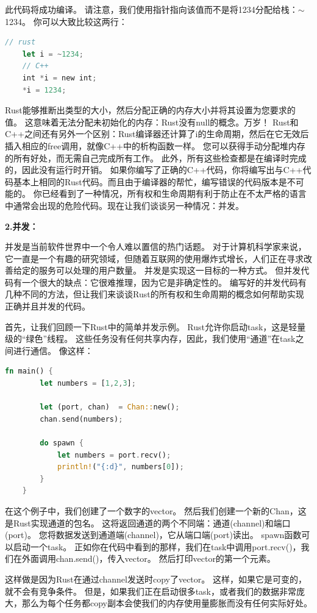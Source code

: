 此代码将成功编译。 请注意，我们使用指针指向该值而不是将1234分配给栈：$\sim$1234。 你可以大致比较这两行：
\begin{lstlisting}[language={Rust}, label={code:forktest},
	caption={forktest.rs}]
	// rust
	let i = ~1234;
	// C++
	int *i = new int;
	*i = 1234;
\end{lstlisting}

Rust能够推断出类型的大小，然后分配正确的内存大小并将其设置为您要求的值。 这意味着无法分配未初始化的内存：Rust没有null的概念。万岁！ Rust和C++之间还有另外一个区别：Rust编译器还计算了i的生命周期，然后在它无效后插入相应的free调用，就像C++中的析构函数一样。 您可以获得手动分配堆内存的所有好处，而无需自己完成所有工作。 此外，所有这些检查都是在编译时完成的，因此没有运行时开销。 如果你编写了正确的C++代码，你将编写出与C++代码基本上相同的Rust代码。而且由于编译器的帮忙，编写错误的代码版本是不可能的。
你已经看到了一种情况，所有权和生命周期有利于防止在不太严格的语言中通常会出现的危险代码。现在让我们谈谈另一种情况：并发。

\textbf{2.并发：}

并发是当前软件世界中一个令人难以置信的热门话题。 对于计算机科学家来说，它一直是一个有趣的研究领域，但随着互联网的使用爆炸式增长，人们正在寻求改善给定的服务可以处理的用户数量。 并发是实现这一目标的一种方式。 但并发代码有一个很大的缺点：它很难推理，因为它是非确定性的。 编写好的并发代码有几种不同的方法，但让我们来谈谈Rust的所有权和生命周期的概念如何帮助实现正确并且并发的代码。

首先，让我们回顾一下Rust中的简单并发示例。 Rust允许你启动task，这是轻量级的“绿色”线程。 这些任务没有任何共享内存，因此，我们使用“通道”在task之间进行通信。 像这样：
\begin{lstlisting}[language={Rust}, label={code:forktest},
	caption={forktest.rs}]
	fn main() {
		let numbers = [1,2,3];
		
		let (port, chan)  = Chan::new();
		chan.send(numbers);
		
		do spawn {
			let numbers = port.recv();
			println!("{:d}", numbers[0]);
		}
	}
\end{lstlisting}

在这个例子中，我们创建了一个数字的vector。 然后我们创建一个新的Chan，这是Rust实现通道的包名。 这将返回通道的两个不同端：通道(channel)和端口(port)。 您将数据发送到通道端(channel)，它从端口端(port)读出。 spawn函数可以启动一个task。 正如你在代码中看到的那样，我们在task中调用port.recv()，我们在外面调用chan.send()，传入vector。 然后打印vector的第一个元素。

这样做是因为Rust在通过channel发送时copy了vector。 这样，如果它是可变的，就不会有竞争条件。 但是，如果我们正在启动很多task，或者我们的数据非常庞大，那么为每个任务都copy副本会使我们的内存使用量膨胀而没有任何实际好处。

